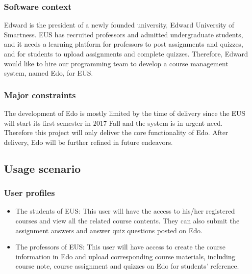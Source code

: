 \documentclass[paper=a4, fontsize=11pt]{scrartcl}
\numberwithin{equation}{section}		%
\numberwithin{figure}{section}			%
\numberwithin{table}{section}				%
\begin{document}
\subsubsection{Software context}
Edward is the president of a newly founded university, Edward University of Smartness. EUS has recruited professors and admitted undergraduate students, and it needs a learning platform for professors to post assignments and quizzes, and for students to upload assignments and complete quizzes. Therefore, Edward would like to hire our programming team to develop a course management system, named Edo, for EUS.
\subsubsection{Major constraints}
The development of Edo is mostly limited by the time of delivery since the EUS will start its first semester in 2017 Fall and the system is in urgent need. Therefore this project will only deliver the core functionality of Edo. After delivery, Edo will be further refined in future endeavors.

\subsection{Usage scenario}

\subsubsection{User profiles}
\begin{itemize}
	\item The students of EUS: This user will have the access to his/her registered courses and view all the related course contents. They can also submit the assignment answers and answer quiz questions posted on Edo.
	\item The professors of EUS: This user will have access to create the course information in Edo and upload corresponding course materials, including course note, course assignment and quizzes on Edo for students' reference.
\end{itemize}
\end{document}
